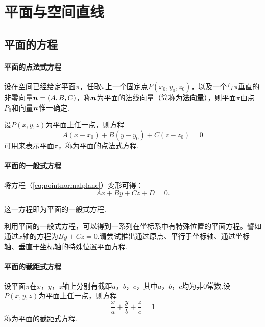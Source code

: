 \chapter{平面与空间直线}

\section{平面的方程}
\subsubsection*{平面的点法式方程}
\par 设在空间已经给定平面$\pi$，任取$\pi$上一个固定点$P(x_0,y_0,z_0)$，以及一个与$\pi$垂直的非零向量$\vb*{n}=(A,B,C)$，称$\vb*{n}$为平面的法线向量（简称为\textbf{法向量}），则平面$\pi$由点$P_0$和向量$\vb*{n}$惟一确定.
\par 设$P(x,y,z)$为平面上任一点，则方程
\begin{equation}\label{eq:pointnormalplane}
  A(x-x_0)+B(y-y_0)+C(z-z_0)=0
\end{equation}
可用来表示平面$\pi$，称为平面的点法式方程.

\subsubsection*{平面的一般式方程}
\par 将方程（\ref{eq:pointnormalplane}）变形可得：
\begin{equation}
  Ax+By+Cz+D=0.
\end{equation}
\par 这一方程即为平面的一般式方程.
\par 利用平面的一般式方程，可以得到一系列在坐标系中有特殊位置的平面方程。譬如通过$x$轴的方程为$By+Cz=0$.请尝试推出通过原点、平行于坐标轴、通过坐标轴、垂直于坐标轴的特殊位置平面方程.

\subsubsection*{平面的截距式方程}
\par 设平面$\pi$在$x$，$y$，$z$轴上分别有截距$a$，$b$，$c$，其中$a$，$b$，$c$均为非0常数.设$P(x,y,z)$为平面上任一点，则方程
\begin{equation}
  \frac{x}{a}+\frac{y}{b}+\frac{z}{c}=1
\end{equation}
称为平面的截距式方程.

